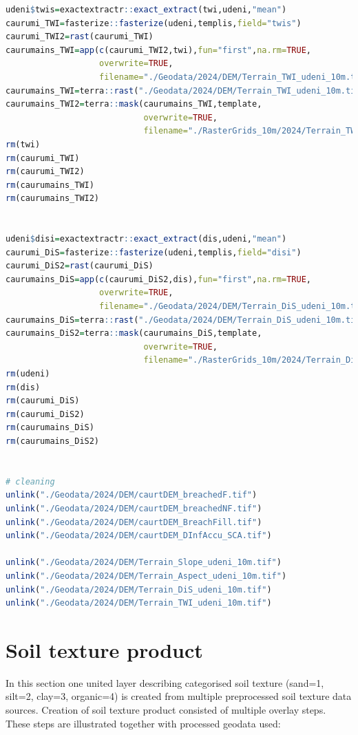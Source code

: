 \documentclass[
]{book}
\begin{document}
\begin{lstlisting}[language=R]
udeni$twis=exactextractr::exact_extract(twi,udeni,"mean")
caurumi_TWI=fasterize::fasterize(udeni,templis,field="twis")
caurumi_TWI2=rast(caurumi_TWI)
caurumains_TWI=app(c(caurumi_TWI2,twi),fun="first",na.rm=TRUE,
                   overwrite=TRUE,
                   filename="./Geodata/2024/DEM/Terrain_TWI_udeni_10m.tif")
caurumains_TWI=terra::rast("./Geodata/2024/DEM/Terrain_TWI_udeni_10m.tif")
caurumains_TWI2=terra::mask(caurumains_TWI,template,
                            overwrite=TRUE,
                            filename="./RasterGrids_10m/2024/Terrain_TWI_udeni2_10m.tif")
rm(twi)
rm(caurumi_TWI)
rm(caurumi_TWI2)
rm(caurumains_TWI)
rm(caurumains_TWI2)


udeni$disi=exactextractr::exact_extract(dis,udeni,"mean")
caurumi_DiS=fasterize::fasterize(udeni,templis,field="disi")
caurumi_DiS2=rast(caurumi_DiS)
caurumains_DiS=app(c(caurumi_DiS2,dis),fun="first",na.rm=TRUE,
                   overwrite=TRUE,
                   filename="./Geodata/2024/DEM/Terrain_DiS_udeni_10m.tif")
caurumains_DiS=terra::rast("./Geodata/2024/DEM/Terrain_DiS_udeni_10m.tif")
caurumains_DiS2=terra::mask(caurumains_DiS,template,
                            overwrite=TRUE,
                            filename="./RasterGrids_10m/2024/Terrain_DiS_udeni2_10m.tif")
rm(udeni)
rm(dis)
rm(caurumi_DiS)
rm(caurumi_DiS2)
rm(caurumains_DiS)
rm(caurumains_DiS2)


# cleaning
unlink("./Geodata/2024/DEM/caurtDEM_breachedF.tif")
unlink("./Geodata/2024/DEM/caurtDEM_breachedNF.tif")
unlink("./Geodata/2024/DEM/caurtDEM_BreachFill.tif")
unlink("./Geodata/2024/DEM/caurtDEM_DInfAccu_SCA.tif")

unlink("./Geodata/2024/DEM/Terrain_Slope_udeni_10m.tif")
unlink("./Geodata/2024/DEM/Terrain_Aspect_udeni_10m.tif")
unlink("./Geodata/2024/DEM/Terrain_DiS_udeni_10m.tif")
unlink("./Geodata/2024/DEM/Terrain_TWI_udeni_10m.tif")
\end{lstlisting}

\section{Soil texture product}\label{Ch05.02}

In this section one united layer describing categorised soil texture (sand=1,
silt=2, clay=3, organic=4) is created from multiple preprocessed soil texture
data sources. Creation of soil texture product consisted of multiple overlay steps.
These steps are illustrated together with processed geodata used:
\end{document}

